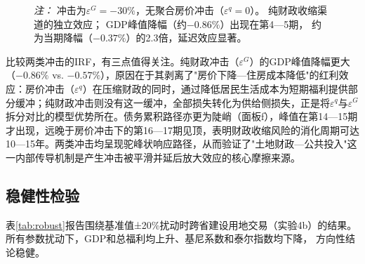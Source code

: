 \documentclass[UTF8,a4paper,12pt]{ctexart}
\theoremstyle{plain}
\theoremstyle{definition}
\theoremstyle{remark}
\begin{document}
\begin{figure}[htbp]
{
}
\vspace{4pt}
\begin{minipage}{0.95\textwidth}
{\textit{注：}
  冲击为$\varepsilon^G=-30\%$，无聚合房价冲击（$\varepsilon^q=0$）。
  纯财政收缩渠道的独立效应；
  GDP峰值降幅（约$-0.86\%$）出现在第4—5期，
  约为当期降幅（$-0.37\%$）的2.3倍，延迟效应显著。}
\end{minipage}
\end{figure}

比较两类冲击的IRF，有三点值得关注。纯财政冲击（$\varepsilon^G$）的GDP峰值降幅更大（$-0.86\%$ vs. $-0.57\%$），原因在于其剥离了"房价下降—住房成本降低"的红利效应：房价冲击（$\varepsilon^q$）在压缩财政的同时，通过降低居民生活成本为短期福利提供部分缓冲；纯财政冲击则没有这一缓冲，全部损失转化为供给侧损失，正是将$\varepsilon^q$与$\varepsilon^G$拆分对比的模型优势所在。债务累积路径亦更为陡峭（面板f），峰值在第14—15期才出现，远晚于房价冲击下的第16—17期见顶，表明财政收缩风险的消化周期可达10—15年。两类冲击均呈现驼峰状响应路径，从而验证了"土地财政—公共投入"这一内部传导机制是产生冲击被平滑并延后放大效应的核心摩擦来源。

\subsection{稳健性检验}

表\ref{tab:robust}报告围绕基准值±20\%扰动时跨省建设用地交易（实验4b）的结果。
所有参数扰动下，GDP和总福利均上升、基尼系数和泰尔指数均下降，
方向性结论稳健。
\end{document}
